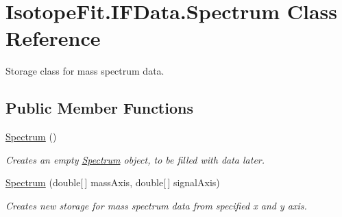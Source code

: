 \hypertarget{class_isotope_fit_1_1_i_f_data_1_1_spectrum}{}\section{Isotope\+Fit.\+I\+F\+Data.\+Spectrum Class Reference}
\label{class_isotope_fit_1_1_i_f_data_1_1_spectrum}


Storage class for mass spectrum data.  


\subsection*{Public Member Functions}
\begin{DoxyCompactItemize}
\item 
\hyperlink{class_isotope_fit_1_1_i_f_data_1_1_spectrum_a57f4b9355944433a34eb668f22bb1f17}{Spectrum} ()
\begin{DoxyCompactList}\small\item\em Creates an empty \hyperlink{class_isotope_fit_1_1_i_f_data_1_1_spectrum}{Spectrum} object, to be filled with data later. \end{DoxyCompactList}\item 
\hyperlink{class_isotope_fit_1_1_i_f_data_1_1_spectrum_a0422d7cbabadc258d3dc6f1fd51f2e36}{Spectrum} (double\mbox{[}$\,$\mbox{]} mass\+Axis, double\mbox{[}$\,$\mbox{]} signal\+Axis)
\begin{DoxyCompactList}\small\item\em Creates new storage for mass spectrum data from specified x and y axis. \end{DoxyCompactList}\end{DoxyCompactItemize}
